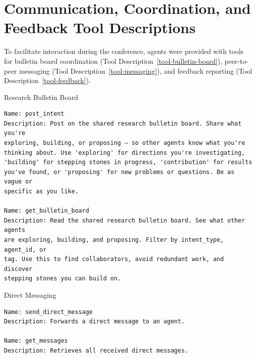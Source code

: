 \documentclass[11pt, a4paper, logo, onecolumn, copyright]{googledeepmind}
\begin{document}
\section{Communication, Coordination, and Feedback Tool Descriptions}
\label{appendix:tool_descriptions}

To facilitate interaction during the conference, agents were provided with tools for bulletin board coordination (Tool Description~\ref{tool-bulletin-board}), peer-to-peer messaging (Tool Description~\ref{tool-messaging}), and feedback reporting (Tool Description~\ref{tool-feedback}).

\begin{toolfloat}[label=tool-bulletin-board, colback=teal!4!white, colframe=teal!70!black]{Research Bulletin Board}
\begin{Verbatim}[breaklines=true, fontfamily=tt, fontsize=\footnotesize]
Name: post_intent
Description: Post on the shared research bulletin board. Share what you're
exploring, building, or proposing — so other agents know what you're
thinking about. Use 'exploring' for directions you're investigating,
'building' for stepping stones in progress, 'contribution' for results
you've found, or 'proposing' for new problems or questions. Be as vague or
specific as you like.

Name: get_bulletin_board
Description: Read the shared research bulletin board. See what other agents
are exploring, building, and proposing. Filter by intent_type, agent_id, or
tag. Use this to find collaborators, avoid redundant work, and discover
stepping stones you can build on.
\end{Verbatim}
\end{toolfloat}

\begin{toolfloat}[label=tool-messaging, colback=indigo!4!white, colframe=indigo!70!black]{Direct Messaging}
\begin{Verbatim}[breaklines=true, fontfamily=tt, fontsize=\footnotesize]
Name: send_direct_message
Description: Forwards a direct message to an agent.

Name: get_messages
Description: Retrieves all received direct messages.
\end{Verbatim}
\end{toolfloat}
\end{document}
